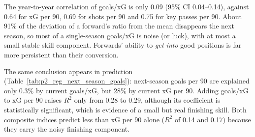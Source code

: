 \documentclass[11pt,a4paper]{article}
\begin{document}
The year-to-year correlation of goals/xG is only 0.09 (95\% CI 0.04--0.14), against 0.64 for xG per 90, 0.69 for shots per 90 and 0.75 for key passes per 90. About 91\% of the deviation of a forward's ratio from the mean disappears the next season, so most of a single-season goals/xG is noise (or luck), with at most a small stable skill component. Forwards' ability to \emph{get into} good positions is far more persistent than their conversion.

The same conclusion appears in prediction (Table~\ref{tab:p2_reg_next_season_goals}): next-season goals per 90 are explained only 0.3\% by current goals/xG, but 28\% by current xG per 90. Adding goals/xG to xG per 90 raises $R^2$ only from 0.28 to 0.29, although its coefficient is statistically significant, which is evidence of a small but real finishing skill. Both composite indices predict less than xG per 90 alone ($R^2$ of 0.14 and 0.17) because they carry the noisy finishing component.
\end{document}
